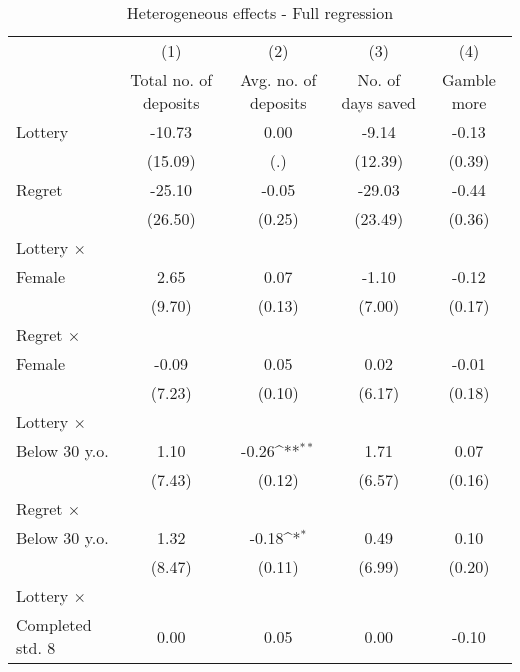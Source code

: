\begin{table}[htbp]\centering
\def\sym#1{\ifmmode^{#1}\else\(^{#1}\)\fi}
\caption{Heterogeneous effects - Full regression}
\begin{tabular}{l*{4}{c}}
\toprule
                &\multicolumn{1}{c}{(1)}&\multicolumn{1}{c}{(2)}&\multicolumn{1}{c}{(3)}&\multicolumn{1}{c}{(4)}\\
                &\multicolumn{1}{c}{Total no. of deposits}&\multicolumn{1}{c}{Avg. no. of deposits}&\multicolumn{1}{c}{No. of days saved}&\multicolumn{1}{c}{Gamble more}\\
\midrule
Lottery         &   -10.73         &     0.00         &    -9.14         &    -0.13         \\
                &  (15.09)         &      (.)         &  (12.39)         &   (0.39)         \\
\addlinespace
Regret          &   -25.10         &    -0.05         &   -29.03         &    -0.44         \\
                &  (26.50)         &   (0.25)         &  (23.49)         &   (0.36)         \\
\addlinespace
Lottery $\times$ \\ Female&     2.65         &     0.07         &    -1.10         &    -0.12         \\
                &   (9.70)         &   (0.13)         &   (7.00)         &   (0.17)         \\
\addlinespace
Regret $\times$ \\ Female&    -0.09         &     0.05         &     0.02         &    -0.01         \\
                &   (7.23)         &   (0.10)         &   (6.17)         &   (0.18)         \\
\addlinespace
Lottery $\times$ \\ Below 30 y.o.&     1.10         &    -0.26\sym{**} &     1.71         &     0.07         \\
                &   (7.43)         &   (0.12)         &   (6.57)         &   (0.16)         \\
\addlinespace
Regret $\times$ \\ Below 30 y.o.&     1.32         &    -0.18\sym{*}  &     0.49         &     0.10         \\
                &   (8.47)         &   (0.11)         &   (6.99)         &   (0.20)         \\
\addlinespace
Lottery $\times$ \\ Completed std. 8&     0.00         &     0.05         &     0.00         &    -0.10         \\

\end{tabular}
\end{table}
